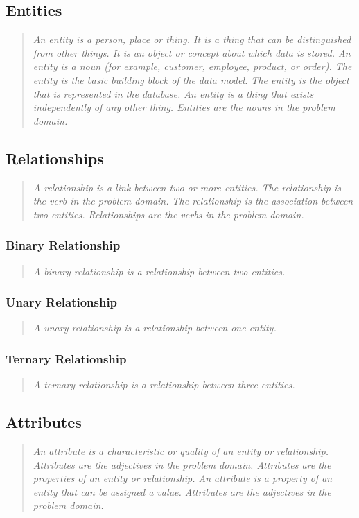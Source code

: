 \documentclass[11pt]{article}
\begin{document}
\subsection{Entities}
\begin{quote}
	\textit{An entity is a person, place or thing. It is a thing that can be distinguished from other things. It is an object or concept about which data is stored. An entity is a noun (for example, customer, employee, product, or order). The entity is the basic building block of the data model. The entity is the object that is represented in the database. An entity is a thing that exists independently of any other thing. Entities are the nouns in the problem domain.}
\end{quote}

\subsection{Relationships}
\begin{quote}
	\textit{A relationship is a link between two or more entities. The relationship is the verb in the problem domain. The relationship is the association between two entities. Relationships are the verbs in the problem domain.}
\end{quote}

\subsubsection{Binary Relationship}
\begin{quote}
	\textit{A binary relationship is a relationship between two entities. }
\end{quote}
\subsubsection{Unary Relationship}
\begin{quote}
	\textit{A unary relationship is a relationship between one entity. }
\end{quote}
\subsubsection{Ternary Relationship}
\begin{quote}
	\textit{A ternary relationship is a relationship between three entities.}
\end{quote}

\subsection{Attributes}
\begin{quote}
	\textit{An attribute is a characteristic or quality of an entity or relationship. Attributes are the adjectives in the problem domain. Attributes are the properties of an entity or relationship. An attribute is a property of an entity that can be assigned a value. Attributes are the adjectives in the problem domain.}
\end{quote}
\end{document}
